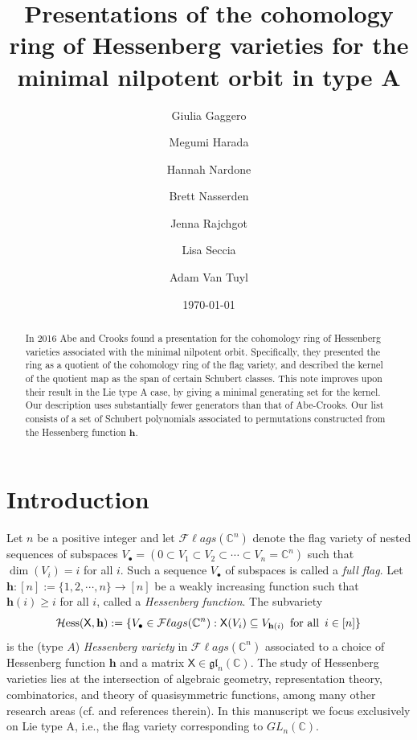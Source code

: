 \documentclass[11pt]{amsart}
\title[Presentations of rank 1 nilpotent Hessenberg varieties]
{Presentations of the cohomology ring of 
Hessenberg varieties for the minimal nilpotent orbit in type A}
\author[G. Gaggero, et al]{Giulia Gaggero}
\author[]{Megumi Harada}
\author[]{Hannah Nardone}
\author[]{Brett Nasserden}
\author[]{Jenna Rajchgot}
\author[]{Lisa Seccia}
\author[]{Adam Van Tuyl}
\date{\today}
\theoremstyle{plain}
\theoremstyle{definition}
\newcommand{\Hess}{\mathcal{H}\mathrm{ess}}
\newcommand{\mx}{\mathsf{X}}
\newcommand{\hess}{{\mathbf h}}
\newcommand{\Fl}{\mathcal{F}\ell ags}
\newcommand{\C}{\mathbb{C}}           %
\numberwithin{equation}{section}
\begin{document}
\begin{abstract} 
In 2016 Abe and Crooks found a presentation for the cohomology
ring of Hessenberg varieties associated with the minimal nilpotent orbit. 
Specifically, they presented the ring as a quotient of the cohomology ring of the flag variety, and described the kernel of the quotient map as the span of certain Schubert classes. This note improves upon their 
result in the Lie type A case, by giving a minimal generating set for the kernel. Our description uses substantially fewer generators than that of Abe-Crooks. Our list consists of a set of 
Schubert polynomials associated to permutations constructed
from the Hessenberg function $\hess$.
\end{abstract}

\maketitle



\section{Introduction}\label{sec: intro} 

Let $n$ be a positive integer and let $\Fl(\C^n)$ denote the flag variety of nested sequences of subspaces $V_\bullet=(0\subset V_1\subset V_2 \subset \cdots \subset V_n = \C^n)$ such that $\dim (V_i)=i$ for all $i$. Such a sequence $V_\bullet$ of subspaces is called a \emph{full flag}. Let $\hess: [n]:=\{1,2,\cdots,n\} \to [n]$ be a weakly increasing function such that $\hess(i)\geq i$ for all $i$, called a \emph{Hessenberg function}. The subvariety 
$$
\Hess(\mx, \hess) := \{V_\bullet \in \Fl(\C^n): \mx (V_i)\subseteq V_{\hess(i)} \, \textup{ for all } \, i \in [n] \}
$$
is the (type $A$) \emph{Hessenberg variety} in $\Fl(\C^n)$ associated to a choice of Hessenberg function $\hess$ and a matrix $\mx \in \mathfrak{gl}_n(\C)$. The study of Hessenberg varieties lies at the intersection of algebraic geometry, representation theory, combinatorics, and theory of quasisymmetric functions, 
among many other research areas (cf. \cite[Part III]{Handbook-Hess} and references therein). In this manuscript we focus exclusively on Lie type A, i.e., the flag variety corresponding to $GL_n(\C)$.  
\end{document}
